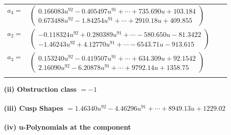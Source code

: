 \documentclass[1p]{elsarticle_modified}
\theoremstyle{definition}
\begin{document}
\begin{tabular}{m{7pt} m{180pt} m{7pt} m{180pt} }
\flushright $a_{4}=$&$\begin{pmatrix}0.166083 u^{92}-0.405497 u^{91}+\cdots+735.690 u+103.184\\0.673488 u^{92}-1.84254 u^{91}+\cdots+2910.18 u+409.855\end{pmatrix}$ \\
\flushright $a_{2}=$&$\begin{pmatrix}-0.118324 u^{92}+0.280389 u^{91}+\cdots-580.650 u-81.3422\\-1.46243 u^{92}+4.12770 u^{91}+\cdots-6543.71 u-913.615\end{pmatrix}$ \\
\flushright $a_{3}=$&$\begin{pmatrix}0.153240 u^{92}-0.419507 u^{91}+\cdots+634.309 u+92.1542\\2.16090 u^{92}-6.20878 u^{91}+\cdots+9792.14 u+1358.75\end{pmatrix}$\\&\end{tabular}
\flushleft \textbf{(ii) Obstruction class $= -1$}\\~\\
\flushleft \textbf{(iii) Cusp Shapes $= 1.46340 u^{92}-4.46296 u^{91}+\cdots+8949.13 u+1229.02$}\\~\\
\newpage\renewcommand{\arraystretch}{1}
\flushleft \textbf{(iv) u-Polynomials at the component}\newline \\
\end{document}
